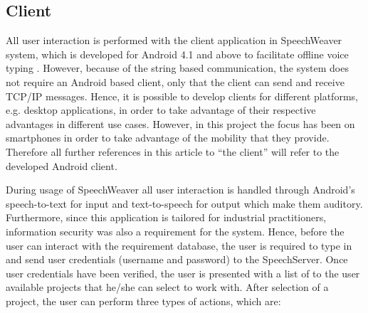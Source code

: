 \documentclass[conference]{IEEEtran}
\begin{document}
\subsection{Client}
All user interaction is performed with the client application in SpeechWeaver system, which is developed for Android 4.1 and above to facilitate offline voice typing \cite{offlvoice}.  
However, because of the string based communication, the system does not require an Android based client, only that the client can send and receive TCP/IP messages.
Hence, it is possible to develop clients for different platforms, e.g. desktop applications, in order to take advantage of their respective advantages in different use cases.
However, in this project the focus has been on smartphones in order to take advantage of the mobility that they provide.
Therefore all further references in this article to ``the client''  will refer to the developed Android client.

During usage of SpeechWeaver all user interaction is handled through Android's speech-to-text for input and text-to-speech for output which make them auditory.
Furthermore, since this application is tailored for industrial practitioners, information security was also a requirement for the system.
Hence, before the user can interact with the requirement database, the user is required to type in and send user credentials (username and password) to the SpeechServer.
Once user credentials have been verified, the user is presented with a list of to the user available projects that he/she can select to work with. 
After selection of a project, the user can perform three types of actions, which are: 

\end{document}
